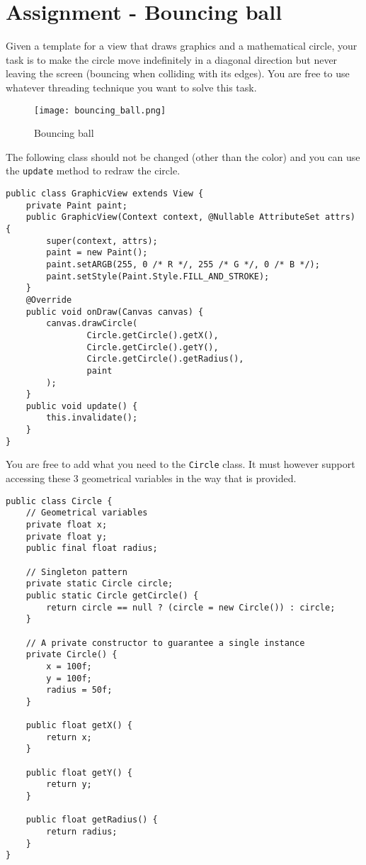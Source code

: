 \section{Assignment - Bouncing ball}
Given a template for a view that draws graphics and a mathematical circle, your task is to make the circle move indefinitely in a diagonal direction but never leaving the screen (bouncing when colliding with its edges). You are free to use whatever threading technique you want to solve this task.

\begin{figure}[H]
\centering
\texttt{[image: bouncing\_ball.png]}
\caption{Bouncing ball}
\label{fig:bball}
\end{figure}

The following class should not be changed (other than the color) and you can use the \texttt{update} method to redraw the circle.
\begin{lstlisting}[style=A_Java]
public class GraphicView extends View {
    private Paint paint;
    public GraphicView(Context context, @Nullable AttributeSet attrs) {
        super(context, attrs);
        paint = new Paint();
        paint.setARGB(255, 0 /* R */, 255 /* G */, 0 /* B */);
        paint.setStyle(Paint.Style.FILL_AND_STROKE);
    }
    @Override
    public void onDraw(Canvas canvas) {
        canvas.drawCircle(
                Circle.getCircle().getX(), 
                Circle.getCircle().getY(),
                Circle.getCircle().getRadius(), 
                paint
        );
    }
    public void update() {
        this.invalidate();
    }
}
\end{lstlisting}
You are free to add what you need to the \texttt{Circle} class. It must however support accessing these 3 geometrical variables in the way that is provided.
\begin{lstlisting}[style=A_Java]
public class Circle {
    // Geometrical variables
    private float x;
    private float y;
    public final float radius;

    // Singleton pattern
    private static Circle circle;
    public static Circle getCircle() {
        return circle == null ? (circle = new Circle()) : circle;
    }

    // A private constructor to guarantee a single instance
    private Circle() {
        x = 100f;
        y = 100f;
        radius = 50f;
    }

    public float getX() {
        return x;
    }

    public float getY() {
        return y;
    }

    public float getRadius() {
        return radius;
    }
}
\end{lstlisting}
